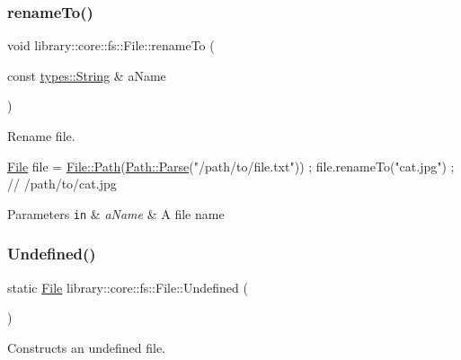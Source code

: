 \subsubsection{\texorpdfstring{rename\+To()}{renameTo()}}
{\footnotesize\ttfamily void library\+::core\+::fs\+::\+File\+::rename\+To (\begin{DoxyParamCaption}\item[{const \hyperlink{classlibrary_1_1core_1_1types_1_1String}{types\+::\+String} \&}]{a\+Name }\end{DoxyParamCaption})}



Rename file. 


\begin{DoxyCode}
\hyperlink{classlibrary_1_1core_1_1fs_1_1File_a7490060f19a21d4ee58bb6cec87a1ca6}{File} file = \hyperlink{classlibrary_1_1core_1_1fs_1_1File_a0e0d8a8becb3cdd21775554e181452d8}{File::Path}(\hyperlink{classlibrary_1_1core_1_1fs_1_1Path_aebf5bd3af83e0b7376616e146f3e55df}{Path::Parse}(\textcolor{stringliteral}{"/path/to/file.txt"})) ;
file.renameTo(\textcolor{stringliteral}{"cat.jpg"}) ; \textcolor{comment}{// /path/to/cat.jpg}
\end{DoxyCode}



\begin{DoxyParams}[1]{Parameters}
\mbox{\tt in}  & {\em a\+Name} & A file name \\
\hline
\end{DoxyParams}
\mbox{\label{classlibrary_1_1core_1_1fs_1_1File_a985adb1a33b94dcdbed2792651eb81af}} 
\subsubsection{\texorpdfstring{Undefined()}{Undefined()}}
{\footnotesize\ttfamily static \hyperlink{classlibrary_1_1core_1_1fs_1_1File}{File} library\+::core\+::fs\+::\+File\+::\+Undefined (\begin{DoxyParamCaption}{ }\end{DoxyParamCaption})\hspace{0.3cm}{\ttfamily [static]}}



Constructs an undefined file. 


